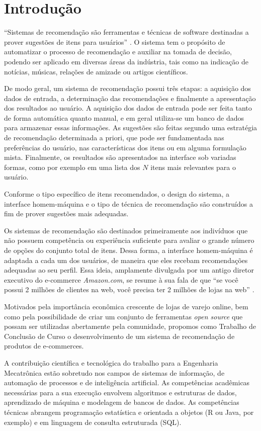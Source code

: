 \chapter[Introdução]{Introdução}
\label{chap:introducao}

``Sistemas de recomendação são ferramentas e técnicas de software destinadas a prover sugestões de itens para usuários'' \cite{ricci2011introduction-chap1}. O sistema tem o propósito de automatizar o processo de recomendação e auxiliar na tomada de decisão, podendo ser aplicado em diversas áreas da indústria, tais como na indicação de notícias, músicas, relações de amizade ou artigos científicos.

De modo geral, um sistema de recomendação possui três etapas: a aquisição dos dados de entrada, a determinação das recomendações e finalmente a apresentação dos resultados ao usuário. A aquisição dos dados de entrada pode ser feita tanto de forma automática quanto manual, e em geral utiliza-se um banco de dados para armazenar essas informações. As sugestões são feitas segundo uma estratégia de recomendação determinada a priori, que pode ser fundamentada nas preferências do usuário, nas características dos itens ou em alguma formulação mista. Finalmente, os resultados são apresentados na interface sob variadas formas, como por exemplo em uma lista dos $N$ itens mais relevantes para o usuário.   

Conforme o tipo específico de itens recomendados, o design do sistema, a interface homem-máquina e o tipo de técnica de recomendação são construídos a fim de prover sugestões mais adequadas.

Os sistemas de recomendação são destinados primeiramente aos indivíduos que não possuem competência ou experiência suficiente para avaliar o grande número de opções do conjunto total de itens. Dessa forma, a interface homem-máquina é adaptada a cada um dos usuários, de maneira que eles recebam recomendações adequadas ao seu perfil. Essa ideia, amplamente divulgada por um antigo diretor executivo do e-commerce \textit{Amazon.com}, se resume à sua fala de que ``se você possui 2 milhões de clientes na web, você precisa ter 2 milhões de lojas na web'' \cite{schafer1999recommender}. 

Motivados pela importância econômica crescente de lojas de varejo online, bem como pela possibilidade de criar um conjunto de ferramentas \textit{open source} que possam ser utilizadas abertamente pela comunidade, propomos como Trabalho de Conclusão de Curso o desenvolvimento de um sistema de recomendação de produtos de e-commerces.  

A contribuição científica e tecnológica do trabalho para a Engenharia Mecatrônica estão sobretudo nos campos de sistemas de informação, de automação de processos e de inteligência artificial. As competências acadêmicas necessárias para a sua execução envolvem algoritmos e estruturas de dados, aprendizado de máquina e modelagem de bancos de dados. As competências técnicas abrangem programação estatística e orientada a objetos (R ou Java, por exemplo) e em linguagem de consulta estruturada (SQL).